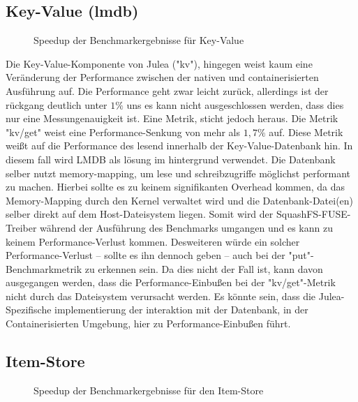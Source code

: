 \subsection{Key-Value (lmdb)}


\begin{figure}
    \centering
    
    \caption{Speedup der Benchmarkergebnisse für Key-Value}
    \label{fig:speedup_kv}
\end{figure}

\FloatBarrier

Die Key-Value-Komponente von Julea ("kv"), hingegen weist kaum eine Veränderung der Performance zwischen der nativen und containerisierten Ausführung auf. Die Performance geht zwar leicht zurück, allerdings ist der rückgang deutlich unter $1\%$ uns es kann nicht ausgeschlossen werden, dass dies nur eine Messungenauigkeit ist. Eine Metrik, sticht jedoch heraus. Die Metrik "kv/get" weist eine Performance-Senkung von mehr als $1,7\%$ auf. Diese Metrik weißt auf die Performance des lesend innerhalb der Key-Value-Datenbank hin. In diesem fall wird LMDB als lösung im hintergrund verwendet. Die Datenbank selber nutzt memory-mapping, um lese und schreibzugriffe möglichst performant zu machen. Hierbei sollte es zu keinem signifikanten Overhead kommen, da das Memory-Mapping durch den Kernel verwaltet wird und die Datenbank-Datei(en) selber direkt auf dem Host-Dateisystem liegen. Somit wird der SquashFS-FUSE-Treiber während der Ausführung des Benchmarks umgangen und es kann zu keinem Performance-Verlust kommen. Desweiteren würde ein solcher Performance-Verlust – sollte es ihn dennoch geben – auch bei der "put"-Benchmarkmetrik zu erkennen sein. Da dies nicht der Fall ist, kann davon ausgegangen werden, dass die Performance-Einbußen bei der "kv/get"-Metrik nicht durch das Dateisystem verursacht werden. Es könnte sein, dass die Julea-Spezifische implementierung der interaktion mit der Datenbank, in der Containerisierten Umgebung, hier zu Performance-Einbußen führt. 

\subsection{Item-Store}

\begin{figure}
    \centering
    
    \caption{Speedup der Benchmarkergebnisse für den Item-Store}
    \label{fig:speedup_item}
\end{figure}


